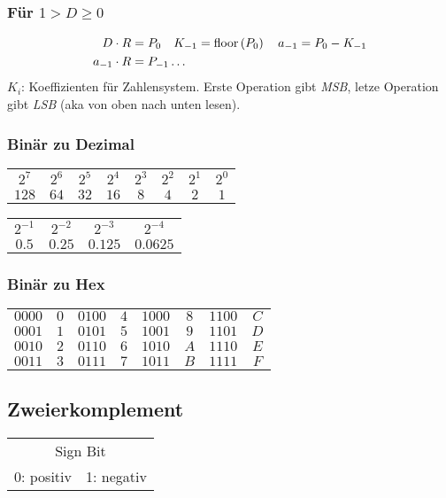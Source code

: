 \subsubsection{Für $1 > D \geq 0$}
\begin{align*}
    D \cdot R &= P_0 \quad K_{-1} = \text{floor}\left(P_0\right) \quad a_{-1} = P_0 - K_{-1}\\ 
    a_{-1} \cdot R &= P_{-1} \dots
\end{align*}
$K_i$: Koeffizienten für Zahlensystem. Erste Operation gibt \emph{MSB}, letze Operation gibt \emph{LSB} (aka von oben nach unten lesen).

\subsubsection{Binär zu Dezimal}
\begin{center}
    \begin{tabular}{c|c|c|c|c|c|c|c}
        $2^7$ & $2^6$ & $2^5$ & $2^4$ & $2^3$ & $2^2$ & $2^1$ & $2^0$\\
        $128$ & $64$ & $32$ & $16$ & $8$ & $4$ & $2$ & $1$
    \end{tabular}
\end{center}
\begin{center}
    \begin{tabular}{c|c|c|c}
        $2^{-1}$ & $2^{-2}$ & $2^{-3}$ & $2^{-4}$\\
        $0.5$ & $0.25$ & $0.125$ & $0.0625$
    \end{tabular}
\end{center}

\subsubsection{Binär zu Hex}
\begin{center}
    \begin{tabular}{c c||c c||c c||c c}
        $0000$ & $0$ & $0100$ & $4$ & $1000$ & $8$ & $1100$ & $C$\\
        $0001$ & $1$ & $0101$ & $5$ & $1001$ & $9$ & $1101$ & $D$\\
        $0010$ & $2$ & $0110$ & $6$ & $1010$ & $A$ & $1110$ & $E$\\
        $0011$ & $3$ & $0111$ & $7$ & $1011$ & $B$ & $1111$ & $F$\\
    \end{tabular}
\end{center}
\subsection{Zweierkomplement}
\begin{center}
    \begin{tabular}{c c}
        \multicolumn{2}{c}{Sign Bit}\\
        0: positiv & 1: negativ
    \end{tabular}
\end{center}
